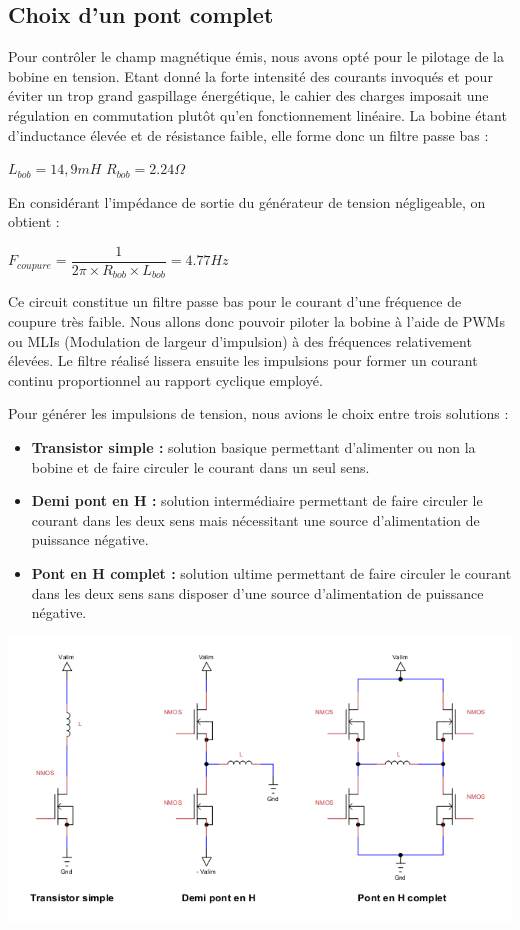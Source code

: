 \documentclass[11pt, french]{article} %
\begin{document}
\subsection{Choix d'un pont complet}
	Pour contrôler le champ magnétique émis, nous avons opté pour le pilotage de la bobine en tension. Etant donné la forte intensité des courants invoqués et pour éviter un trop grand gaspillage énergétique, le cahier des charges imposait une régulation en commutation plutôt qu'en fonctionnement linéaire. La bobine étant d'inductance élevée et de résistance faible, elle forme donc un filtre passe bas :

\medskip
$ L_{bob} = 14,9 mH $
$ R_{bob} = 2.24 \Omega $

\medskip
En considérant l'impédance de sortie du générateur de tension négligeable, on obtient :

$ F_{coupure} = \dfrac{1}{2\pi \times R_{bob} \times L_{bob}} = 4.77 Hz $

\medskip
Ce circuit constitue un filtre passe bas pour le courant d'une fréquence de coupure très faible. Nous allons donc pouvoir piloter la bobine à l'aide de PWMs ou MLIs (Modulation de largeur d'impulsion) à des fréquences relativement élevées. Le filtre réalisé lissera ensuite les impulsions pour former un courant continu proportionnel au rapport cyclique employé.

\medskip
\noindent
Pour générer les impulsions de tension, nous avions le choix entre trois solutions :

\medskip
\begin{itemize}
	\item \textbf{Transistor simple :} solution basique permettant d'alimenter ou non la bobine et de faire circuler le courant dans un seul sens.
	\item \textbf{Demi pont en H :} solution intermédiaire permettant de faire circuler le courant dans les deux sens mais nécessitant une source d'alimentation de puissance négative.
	\item \textbf{Pont en H complet :} solution ultime permettant de faire circuler le courant dans les deux sens sans disposer d'une source d'alimentation de puissance négative.
\end{itemize}

\begin{center}
\includegraphics[width = 15cm]{SolutionAnalogique/Ponts.png} 
\end{center}
\end{document}
